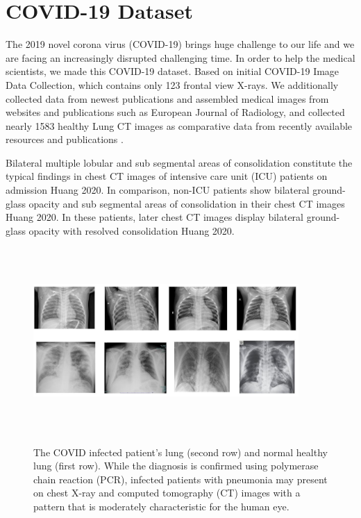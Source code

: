 \section{COVID-19 Dataset} %
\label{sub:amet}

The 2019 novel corona virus (COVID-19) brings huge challenge to our life and we are facing an increasingly disrupted challenging time. In order to help the medical scientists, we made this COVID-19 dataset. Based on initial COVID-19 Image Data Collection\cite{37}, which contains only 123 frontal view X-rays. We additionally collected data from newest publications and  assembled medical images from websites and publications such as European Journal of Radiology\cite{36}, and collected nearly 1583 healthy Lung CT images as comparative data from recently available resources and publications\cite{37} \cite{38}.


Bilateral multiple lobular and sub segmental areas of consolidation constitute the typical findings in chest CT images of intensive care unit (ICU) patients on admission Huang 2020. In comparison, non-ICU patients show bilateral ground-glass opacity and sub segmental areas of consolidation in their chest CT images Huang 2020. In these patients, later chest CT images display bilateral ground-glass opacity with resolved consolidation Huang 2020.

\begin{figure}[t]
\begin{center}
\includegraphics[height=200pt,width=0.9\textwidth]{thesis-template-master/images/covidlungandhealthylung.JPG}
\label{fig:cellnet}
\end{center}
\caption{The COVID infected patient’s lung (second row) and normal healthy lung (first row). While the diagnosis is confirmed using polymerase chain reaction (PCR), infected patients with pneumonia may present on chest X-ray and computed tomography (CT) images with a pattern that is moderately characteristic for the human eye.}
\end{figure}


